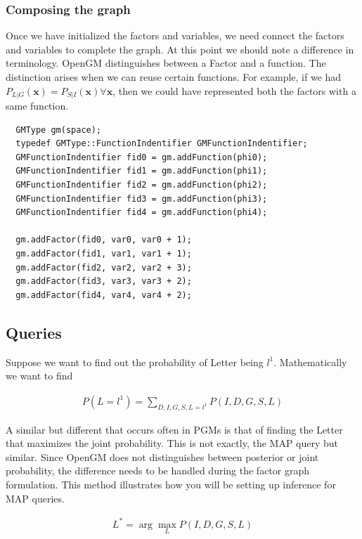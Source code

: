 \documentclass[12pt,oneside,letterpaper]{article}
\begin{document}
\subsubsection{Composing the graph}

Once we have initialized the factors and variables, we need connect the factors
and variables to complete the graph. At this point we should note a
difference in terminology. OpenGM distinguishes between a Factor and a
function.  The distinction arises when we can reuse certain functions. For
example, if we had $P_{L|G}(\mathbf{x}) = P_{S|I}(\mathbf{x}) \forall
\mathbf{x}$, then we could have represented both the factors with a same
function.

\begin{lstlisting}
  GMType gm(space);
  typedef GMType::FunctionIndentifier GMFunctionIndentifier;
  GMFunctionIndentifier fid0 = gm.addFunction(phi0);
  GMFunctionIndentifier fid1 = gm.addFunction(phi1);
  GMFunctionIndentifier fid2 = gm.addFunction(phi2);
  GMFunctionIndentifier fid3 = gm.addFunction(phi3);
  GMFunctionIndentifier fid4 = gm.addFunction(phi4);

  gm.addFactor(fid0, var0, var0 + 1);
  gm.addFactor(fid1, var1, var1 + 1);
  gm.addFactor(fid2, var2, var2 + 3);
  gm.addFactor(fid3, var3, var3 + 2);
  gm.addFactor(fid4, var4, var4 + 2);
\end{lstlisting}


\subsection{Queries}
Suppose we want to find out the probability of Letter being $l^1$.
Mathematically we want to find

\begin{align}
  P(L = l^1) = \sum_{D,I,G,S,L=l^1} P(I, D, G, S, L)
  \label{eq:marginal}
\end{align}

A similar but different that occurs often in PGMs is that of finding the Letter
that maximizes the joint probability. This is not exactly, the MAP query but
similar. Since OpenGM does not distinguishes between posterior or joint
probability, the difference needs to be handled during the factor graph
formulation. This method illustrates how you will be setting up inference for
MAP queries. 

\begin{align}
  L^* = \arg \max_{L} P(I, D, G, S, L)
  \label{eq:map}
\end{align}
\end{document}
